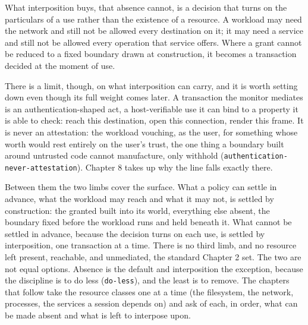 What interposition buys, that absence cannot, is a decision that turns
on the particulars of a use rather than the existence of a resource. A
workload may need the network and still not be allowed every destination
on it; it may need a service and still not be allowed every operation
that service offers. Where a grant cannot be reduced to a fixed boundary
drawn at construction, it becomes a transaction decided at the moment of
use.

There is a limit, though, on what interposition can carry, and it is
worth setting down even though its full weight comes later. A
transaction the monitor mediates is an authentication-shaped act, a
host-verifiable use it can bind to a property it is able to check: reach
this destination, open this connection, render this frame. It is never
an attestation: the workload vouching, as the user, for something whose
worth would rest entirely on the user's trust, the one thing a boundary
built around untrusted code cannot manufacture, only withhold
(\texttt{authentication-never-attestation}). Chapter 8 takes up why the
line falls exactly there.

Between them the two limbs cover the surface. What a policy can settle
in advance, what the workload may reach and what it may not, is settled
by construction: the granted built into its world, everything else
absent, the boundary fixed before the workload runs and held beneath it.
What cannot be settled in advance, because the decision turns on each
use, is settled by interposition, one transaction at a time. There is no
third limb, and no resource left present, reachable, and unmediated, the
standard Chapter 2 set. The two are not equal options. Absence is the
default and interposition the exception, because the discipline is to do
less (\texttt{do-less}), and the least is to remove. The chapters that
follow take the resource classes one at a time (the filesystem, the
network, processes, the services a session depends on) and ask of each,
in order, what can be made absent and what is left to interpose upon.
